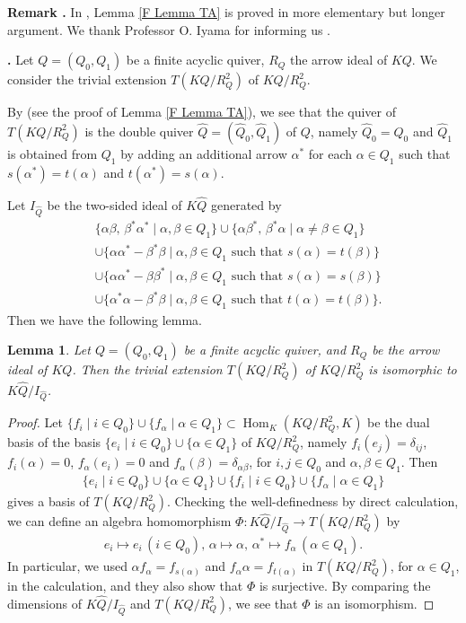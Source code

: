 \documentclass[12pt]{amsart}
\newtheorem{lem}[thm]{Lemma}
\def \para{\refstepcounter{thm} \par\medskip\noindent
                \textbf{\thethm .} }
\def \remark{\refstepcounter{thm} \par\medskip\noindent
                \textbf{Remark \thethm .} }
\numberwithin{equation}{thm}
\renewcommand\a{\alpha}  %
\renewcommand\b{\beta}   %
\renewcommand\d{\delta}  %
\newcommand\wh{\widehat}
\newcommand\ra{\rightarrow}
\newcommand\Hom{\operatorname{Hom}}
\newcounter{ni}
\begin{document}

\remark 
In \cite{O}, Lemma \ref{F Lemma TA} is proved in more elementary but longer argument. 
We thank Professor O. Iyama for informing us \cite[Lemma 1.3]{A}.  


\para 
Let $Q=(Q_0,Q_1)$ be a finite acyclic quiver, 
$R_Q$ the arrow ideal of $KQ$. 
We consider the trivial extension $T(KQ/ R_Q^2)$ of $KQ/R_Q^2$. 

By \cite[Lemma 1.3]{A} (see the proof of Lemma \ref{F Lemma TA}), 
we see that the quiver of $T(KQ/R_Q^2)$ is the double quiver 
$\wh{Q}=(\wh{Q}_0, \wh{Q}_1)$ of $Q$, 
namely $\wh{Q}_0=Q_0$ and $\wh{Q}_1$ is obtained from $Q_1$ by adding an additional arrow $\a^*$ 
for each $\a \in Q_1$ such that $s(\a^*) = t(\a)$ and $t(\a^*)=s (\a)$.  

Let $I_{\wh{Q}}$ be the two-sided ideal of $K \wh{Q}$ generated by 
\begin{align*}
&\{ \a \b, \, \b^* \a^* \mid \a, \b \in Q_1\} 
\cup 
\{ \a \b^*, \, \b^* \a \mid \a \not=\b \in Q_1 \} 
\\
&\cup 
\{ \a \a^* - \b^* \b \mid \a, \b \in Q_1 \text{ such that } s (\a) = t (\b)\} 
\\
&\cup 
\{ \a \a^* - \b \b^* \mid \a, \b \in Q_1 \text{ such that } s (\a) = s (\b)\} 
\\
&\cup 
\{ \a^* \a - \b^* \b \mid \a, \b \in Q_1 \text{ such that } t(\a) = t(\b)\}. 
\end{align*}
Then we have the following lemma. 


\begin{lem} 
\label{F Lemma KQ RQ2}
Let $Q=(Q_0,Q_1)$ be a finite acyclic quiver, 
and $R_Q$ be the arrow ideal of $KQ$. 
Then the trivial extension $T(KQ/ R_Q^2)$ of $KQ/ R_Q^2$ 
is isomorphic to $K \wh{Q}/ I_{\wh{Q}}$.
\end{lem}

\begin{proof}
Let $\{f_{i} \mid i \in Q_0\} \cup \{ f_{\a} \mid \a \in Q_1\} \subset \Hom_{K} (KQ/ R_Q^2, K)$ 
be the dual basis of the basis
$\{e_i \mid i \in Q_0\} \cup \{\a \in Q_1\}$ of $KQ/ R_Q^2$,
namely $f_{i}(e_j)=\d_{ij}$, $f_{i}(\a)=0$, $f_{\a}(e_i)=0$ and $f_{\a}(\b) = \d_{\a \b}$, 
for $i,j \in Q_0$ and $\a, \b \in Q_1$. 
Then
\begin{align*}
\{e_i \mid i \in Q_0\} \cup \{\a \in Q_1\} \cup \{f_{i} \mid i \in Q_0\} \cup \{ f_{\a} \mid \a \in Q_1\}
\end{align*}
gives a basis of $T(KQ/ R_Q^2)$. 
Checking the well-definedness by direct calculation,
we can define an algebra homomorphism $\Phi: K \wh{Q}/ I_{\wh{Q}} \ra T (KQ/ R_Q^2)$ by
\begin{align*} 
e_i \mapsto e_i \, (i \in Q_0), \, 
\a \mapsto \a, \, \a^* \mapsto f_{\a} \, (\a \in Q_1). 
\end{align*} 
In particular, we used
$\a f_{\a} = f_{s(\a)}$ and $f_\a \a = f_{t (\a)}$ in $T(KQ/ R_Q^2)$, for $\a \in Q_1$, 
in the calculation, and they also show that
$\Phi$ is surjective. 
By comparing the dimensions of $K \wh{Q}/ I_{\wh{Q}}$ and $T(KQ/ R_Q^2)$, 
we see that $\Phi$ is an isomorphism.  
\end{proof} 
\end{document}
